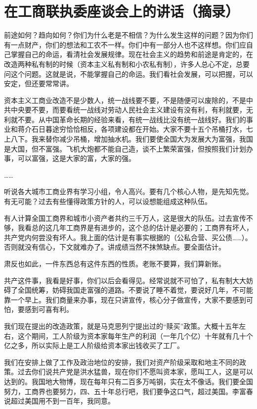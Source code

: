 \section[在工商联执委座谈会上的讲话（摘录）（一九五五年）]{在工商联执委座谈会上的讲话（摘录）}


前途如何？趋向如何？你们为什么老是不相信？为什么发生这样的问题？因为你们有一点财产，你们的想法和工农不一样。你们中有一部分人也不这样想。你们应自己掌握自己的命运，看清社会发展规律。现在社会主义的趋势和前途是肯定的，在改造两种私有制的时候（资本主义私有制和小农私有制），许多人总心不定，总要问这个问题。这就是说，不能掌握自己的命运。我们看社会发展，可以把握，可以安定，但还要常常讲。

资本主义工商业改造不是少数人，统一战线要不要，不是随便可以废除的，不是中共中央要不要，而要看统一战线对劳动人民社会主义建设有没有利，有利就要，无利就不要。从中国革命长期的经验来看，有统一战线比没有统一战线好。我们的事业和蒋介石日暮途穷恰恰相反，各项建设都在开始。大家不要十五个吊桶打水，七上八下。我来替你减少吊桶，增加抽水机。我们要使全国大为发展大为富强，我国是大国，但不富强。飞机大炮都不能自己造，谈不上繁荣富强，但按照我们计划办事，可以富强，这是大家的富，大家的强。

……

听说各大城市工商业界有学习小组，令人高兴。要有几个核心人物，是先知先觉。有无可能？过去有些懂得政策方针的人，可以设想能组成这种队伍。

有人计算全国工商界和城市小资产者共约三千万人，这是很大的队伍。过去宣传不够，我看总的这几年工商界是有进步的，这个总的估计是必要的；工商界有坏人，共产党内何尝没有坏人。我上面的估计是有事实根据的（公私合营、买公债……）。否则就没有信心，下文就难办了。讲成绩当然不抹煞缺点。要全面估计。

肃反也如此，一件东西总有这件东西的性质。老账不要算，我们算新账。

共产这件事，我看是好事，你们以后会看得见。经常说就不可怕了，私有制大大妨碍了全国统筹，妨碍我国走富强的道路。不要说了睡不着觉，要说好几年，不可能靠一个早上。我们商量来办事，现在只讲宣传，核心分子做宣传，大家不要感到可怕，要感到可喜有利。

我们现在提出的改造政策，就是马克思列宁提出过的“赎买”政策。大概十五年左右，这个期间，工人阶级为资本家每年生产的利润（一年几个亿）十年就有几十个亿之多，所以实际上是工人阶级给资本家出钱收买了工厂。

我们在安排上做了工作及政治地位的安排，我们对资产阶级采取和地主不同的政策。过去你们说共产党是洪水猛兽，现在你们不愿叫资本家，愿叫工人，这是可以达到的。我国地大物博，现在每年只有二百多万吨钢，实在太不像话。我们要全国努力，工商界也要努力，四、五十年总行吧，我们要争这口气，超过美国。李富春说超过美国用不到一百年，我同意。

